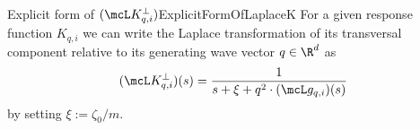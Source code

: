 \begin{mpos}{Explicit form of $(\mcL K_{q,i}^\perp)$}{ExplicitFormOfLaplaceK}
    For a given response function $K_{q,i}$ we can write the Laplace transformation of its transversal component relative to its generating wave vector $q\in\R^d$ as 
    \[
        (\mcL K_{q,i}^\perp)(s) = \frac{
            1
        }{
            s + \xi + q^2\cdot (\mcL g_{q,i})(s)
        }
    \]
    by setting $\xi := \zeta_0/m$.
\end{mpos}